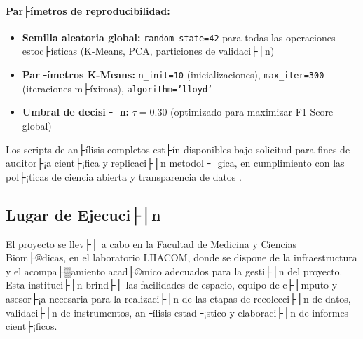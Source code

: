 \paragraph{Par├ímetros de reproducibilidad:}
\begin{itemize}
    \item \textbf{Semilla aleatoria global:} \texttt{random\_state=42} para todas las operaciones estoc├ísticas (K-Means, PCA, particiones de validaci├│n)
    \item \textbf{Par├ímetros K-Means:} \texttt{n\_init=10} (inicializaciones), \texttt{max\_iter=300} (iteraciones m├íximas), \texttt{algorithm='lloyd'}
    \item \textbf{Umbral de decisi├│n:} $\tau=0.30$ (optimizado para maximizar F1-Score global)
\end{itemize}

Los scripts de an├ílisis completos est├ín disponibles bajo solicitud para fines de auditor├¡a cient├¡fica y replicaci├│n metodol├│gica, en cumplimiento con las pol├¡ticas de ciencia abierta y transparencia de datos \citep{Wilkinson2016FAIR}.

\subsection{Lugar de Ejecuci├│n}

El proyecto se llev├│ a cabo en la Facultad de Medicina y Ciencias Biom├®dicas, en el laboratorio LIIACOM, donde se dispone de la infraestructura y el acompa├▒amiento acad├®mico adecuados para la gesti├│n del proyecto. Esta instituci├│n brind├│ las facilidades de espacio, equipo de c├│mputo y asesor├¡a necesaria para la realizaci├│n de las etapas de recolecci├│n de datos, validaci├│n de instrumentos, an├ílisis estad├¡stico y elaboraci├│n de informes cient├¡ficos.
